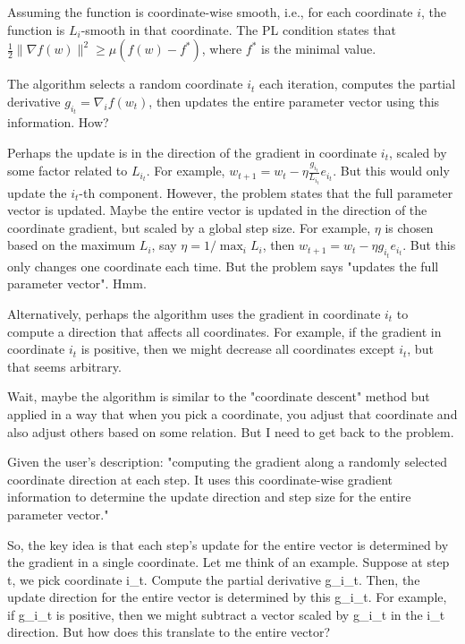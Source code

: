 \documentclass{article}
\begin{document}
Assuming the function is coordinate-wise smooth, i.e., for each coordinate \( i \), the function is \( L_i \)-smooth in that coordinate. The PL condition states that \( \frac{1}{2}\|\nabla f(w)\|^2 \geq \mu (f(w) - f^*) \), where \( f^* \) is the minimal value.

The algorithm selects a random coordinate \( i_t \) each iteration, computes the partial derivative \( g_{i_t} = \nabla_i f(w_t) \), then updates the entire parameter vector using this information. How?

Perhaps the update is in the direction of the gradient in coordinate \( i_t \), scaled by some factor related to \( L_{i_t} \). For example, \( w_{t+1} = w_t - \eta \frac{g_{i_t}}{L_{i_t}} e_{i_t} \). But this would only update the \( i_t \)-th component. However, the problem states that the full parameter vector is updated. Maybe the entire vector is updated in the direction of the coordinate gradient, but scaled by a global step size. For example, \( \eta \) is chosen based on the maximum \( L_i \), say \( \eta = 1/\max_i L_i \), then \( w_{t+1} = w_t - \eta g_{i_t} e_{i_t} \). But this only changes one coordinate each time. But the problem says "updates the full parameter vector". Hmm.

Alternatively, perhaps the algorithm uses the gradient in coordinate \( i_t \) to compute a direction that affects all coordinates. For example, if the gradient in coordinate \( i_t \) is positive, then we might decrease all coordinates except \( i_t \), but that seems arbitrary.

Wait, maybe the algorithm is similar to the "coordinate descent" method but applied in a way that when you pick a coordinate, you adjust that coordinate and also adjust others based on some relation. But I need to get back to the problem.

Given the user's description: "computing the gradient along a randomly selected coordinate direction at each step. It uses this coordinate-wise gradient information to determine the update direction and step size for the entire parameter vector."

So, the key idea is that each step's update for the entire vector is determined by the gradient in a single coordinate. Let me think of an example. Suppose at step t, we pick coordinate i_t. Compute the partial derivative g_{i_t}. Then, the update direction for the entire vector is determined by this g_{i_t}. For example, if g_{i_t} is positive, then we might subtract a vector scaled by g_{i_t} in the i_t direction. But how does this translate to the entire vector?
\end{document}
